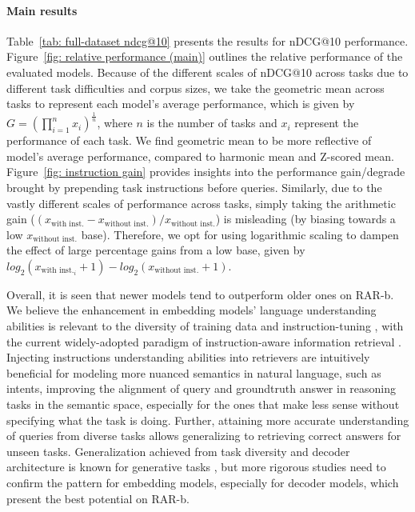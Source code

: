 \documentclass{article} %
\begin{document}
\paragraph{Main results} Table~\ref{tab: full-dataset ndcg@10} presents the results for nDCG@10 performance. Figure~\ref{fig: relative performance (main)} outlines the relative performance of the evaluated models. Because of the different scales of nDCG@10 across tasks due to different task difficulties and corpus sizes, we take the geometric mean across tasks to represent each model's average performance, which is given by $G = \left( \prod_{i=1}^{n} x_i \right)^{\frac{1}{n}}$, where $n$ is the number of tasks and $x_i$ represent the performance of each task. We find geometric mean to be more reflective of model's average performance, compared to harmonic mean and Z-scored mean. Figure~\ref{fig: instruction gain} provides insights into the performance gain/degrade brought by prepending task instructions before queries. Similarly, due to the vastly different scales of performance across tasks, simply taking the arithmetic gain ($\left(x_{\text{with inst.}} - x_{\text{without inst.}} \right)/x_{\text{without inst.}}$) is misleading (by biasing towards a low $x_{\text{without inst.}}$ base). Therefore, we opt for using logarithmic scaling to dampen the effect of large percentage gains from a low base, given by $log_2(x_{\text{with inst.}_i}+1)-log_2(x_{\text{without inst.}}+1)$.

Overall, it is seen that newer models tend to outperform older ones on RAR-b. We believe the enhancement in embedding models' language understanding abilities is relevant to the diversity of training data and instruction-tuning \citep{wang2023improving}, with the current widely-adopted paradigm of instruction-aware information retrieval \citep{asai2022task,su2022one,wang2023improving,muennighoff2024generative}. Injecting instructions understanding abilities into retrievers are intuitively beneficial for modeling more nuanced semantics in natural language, such as intents, improving the alignment of query and groundtruth answer in reasoning tasks in the semantic space, especially for the ones that make less sense without specifying what the task is doing. Further, attaining more accurate understanding of queries from diverse tasks allows generalizing to retrieving correct answers for unseen tasks. Generalization achieved from task diversity and decoder architecture is known for generative tasks \citep{wei2021finetuned,wang2022language,wang2022super}, but more rigorous studies need to confirm the pattern for embedding models, especially for decoder models, which present the best potential on RAR-b.
\end{document}
